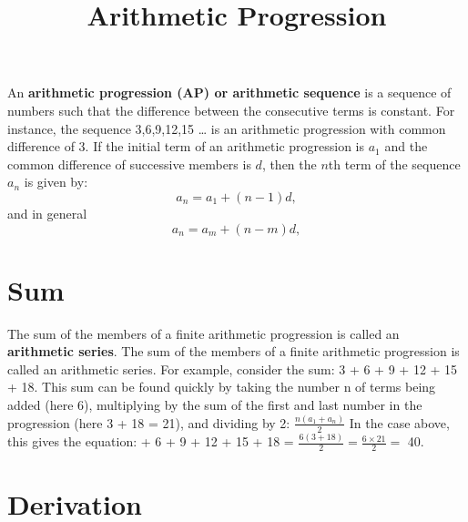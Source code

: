 \documentclass{article}
\title{Arithmetic Progression}
\date{}
\begin{document}
\maketitle
\date{}
An \textbf{arithmetic progression (AP) or arithmetic sequence} is a sequence of numbers such that the difference between the consecutive terms is constant. For instance, the sequence 3,6,9,12,15 … is an arithmetic progression with common difference of 3.\newline
If the initial term of an arithmetic progression is ${a_1}$ and the common difference of successive members is $d$, then the $n$th term of the sequence ${a_n}$ is given by:
\begin{equation}
a_n = a_1 + (n - 1)d,
\end{equation}
and in general
\begin{equation}
a_n = a_m + (n - m	)d,
\end{equation}
\section*{Sum}	
The sum of the members of a finite arithmetic progression is called an \textbf{arithmetic series}.
The sum of the members of a finite arithmetic progression is called an arithmetic series. For example, consider the sum:
3 + 6 + 9 + 12 + 15 + 18.
This sum can be found quickly by taking the number n of terms being added (here 6), multiplying by the sum of the first and last number in the progression (here 3 + 18 = 21), and dividing by 2:\newline
$\frac{n(a_1 + a_n)}{2}$\newline
In the case above, this gives the equation: + 6 + 9 + 12 + 15 + 18 = $\frac{6(3 + 18)}{2} = \frac{6 \times 21}{2} =$ 40.
\section*{Derivation}
\end{document}
